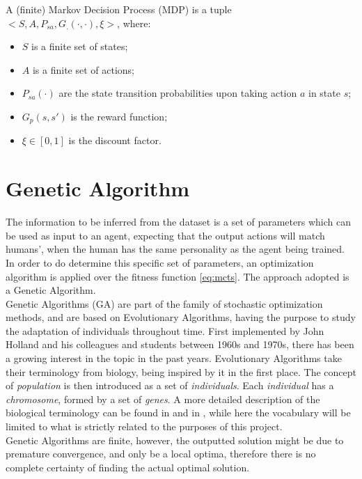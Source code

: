 \begin{definition}
A (finite) Markov Decision Process (MDP) is a tuple \\$<S, A, P_{sa}, G_.(\cdot,\cdot),\xi>$, where:
\begin{itemize}
\item $S$ is a finite set of states;
\item $A$ is a finite set of actions;
\item $P_{sa}(\cdot)$ are the state transition probabilities upon taking action $a$ in state $s$;
\item $G_p(s,s')$ is the reward function;
\item $\xi\in[0,1]$ is the discount factor.
\end{itemize}
\end{definition}
\section{Genetic Algorithm}\label{sec:gatheory}
The information to be inferred from the dataset is a set of parameters which can be used as input to an agent, expecting that the output actions will match humans', when the human has the same personality as the agent being trained. In order to do determine this specific set of parameters, an optimization algorithm is applied over the fitness function \ref{eq:mcts}. The approach adopted is a Genetic Algorithm.\\ Genetic Algorithms (GA) are part of the family of stochastic optimization methods, and are based on Evolutionary Algorithms, having the purpose to study the adaptation of individuals throughout time. First implemented by John Holland and his colleagues and students between 1960s and 1970s\cite{holland1992adaptation}, there has been a growing interest in the topic in the past years. Evolutionary Algorithms take their terminology from biology, being inspired by it in the first place. The concept of \emph{population} is then introduced as a set of \emph{individuals}. Each \emph{individual} has a \emph{chromosome}, formed by a set of \emph{genes}. A more detailed description of the biological terminology can be found in \cite[p.~5]{mitchell1998introduction} and in \cite[p.~35]{wahde2008biologically}, while here the vocabulary will be limited to what is strictly related to the purposes of this project.\\Genetic Algorithms are finite, however, the outputted solution might be due to premature convergence, and only be a local optima, therefore there is no complete certainty of finding the actual optimal solution. 
